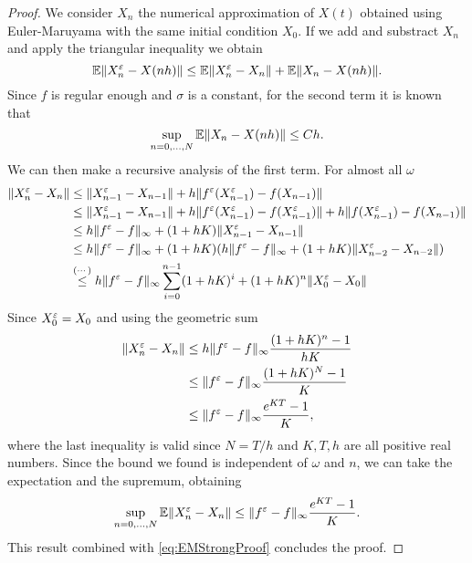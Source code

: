 \begin{proof} We consider $X_n$ the numerical approximation of $X(t)$ obtained using Euler-Maruyama with the same initial condition $X_0$. If we add and substract $X_n$ and apply the triangular inequality we obtain
\begin{equation*}
	\mathbb{E} \|X_n^\varepsilon - X(nh)\| \leq \mathbb{E} \|X_n^\varepsilon - X_n\| + \mathbb{E} \|X_n - X(nh)\|. \\
\end{equation*}
Since $f$ is regular enough and $\sigma$ is a constant, for the second term it is known that
\begin{equation}\label{eq:EMStrongProof}
	\sup_{n = 0, \dots, N} \mathbb{E} \|X_n - X(nh)\| \leq C h.
\end{equation}
We can then make a recursive analysis of the first term. For almost all $\omega$
\begin{equation*}
\begin{aligned}
	\|X^\varepsilon_n - X_n\| &\leq \|X_{n-1}^\varepsilon - X_{n-1}\| + h\|f^\varepsilon(X^\varepsilon_{n-1}) - f(X_{n-1})\|  \\
	&\leq \|X_{n-1}^\varepsilon - X_{n-1}\| + h\|f^\varepsilon(X^\varepsilon_{n-1}) - f(X^\varepsilon_{n-1})\| + h\|f(X^\varepsilon_{n-1}) - f(X_{n-1})\| \\
	&\leq h  \|f^\varepsilon - f\|_{\infty} + (1 + hK) \|X_{n-1}^\varepsilon - X_{n-1}\| \\
	&\leq h  \|f^\varepsilon - f\|_{\infty} + (1 + hK) (h  \|f^\varepsilon - f\|_{\infty} + (1 + hK)\|X_{n-2}^\varepsilon - X_{n-2}\|) \\
	&\stackrel{(\cdots)}{\leq} h  \|f^\varepsilon - f\|_{\infty} \sum_{i = 0}^{n-1} (1 + hK)^i + (1 + hK)^n \|X_0^\varepsilon - X_0\|
\end{aligned}
\end{equation*}
Since $X_0^\varepsilon = X_0$ and using the geometric sum
\begin{equation*}
\begin{aligned}
	\|X^\varepsilon_n - X_n\| &\leq h  \|f^\varepsilon - f\|_{\infty} \frac{(1 + hK)^n - 1}{hK} \\
	&\leq  \|f^\varepsilon - f\|_{\infty} \frac{(1 + hK)^N - 1}{K} \\
	&\leq  \|f^\varepsilon - f\|_{\infty} \frac{e^{KT} - 1}{K},
\end{aligned}
\end{equation*}
where the last inequality is valid since $N = T/h$ and $K, T, h$ are all positive real numbers. Since the bound we found is independent of $\omega$ and $n$, we can take the expectation and the supremum, obtaining
\begin{equation}\label{eq:DiffXeplnXn}
	\sup_{n = 0, \dots, N} \mathbb{E} \|X^\varepsilon_n - X_n\| \leq  \|f^\varepsilon - f\|_{\infty} \frac{e^{KT} - 1}{K}.
\end{equation}
This result combined with \eqref{eq:EMStrongProof} concludes the proof.
\end{proof}
